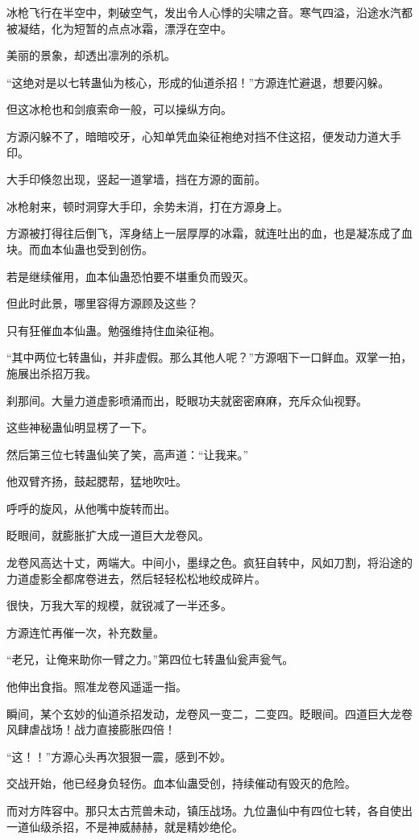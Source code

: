 \begin{this_body}
冰枪飞行在半空中，刺破空气，发出令人心悸的尖啸之音。寒气四溢，沿途水汽都被凝结，化为短暂的点点冰霜，漂浮在空中。

美丽的景象，却透出凛冽的杀机。

“这绝对是以七转蛊仙为核心，形成的仙道杀招！”方源连忙避退，想要闪躲。

但这冰枪也和剑痕索命一般，可以操纵方向。

方源闪躲不了，暗暗咬牙，心知单凭血染征袍绝对挡不住这招，便发动力道大手印。

大手印倏忽出现，竖起一道掌墙，挡在方源的面前。

冰枪射来，顿时洞穿大手印，余势未消，打在方源身上。

方源被打得往后倒飞，浑身结上一层厚厚的冰霜，就连吐出的血，也是凝冻成了血块。而血本仙蛊也受到创伤。

若是继续催用，血本仙蛊恐怕要不堪重负而毁灭。

但此时此景，哪里容得方源顾及这些？

只有狂催血本仙蛊。勉强维持住血染征袍。

“其中两位七转蛊仙，并非虚假。那么其他人呢？”方源咽下一口鲜血。双掌一拍，施展出杀招万我。

刹那间。大量力道虚影喷涌而出，眨眼功夫就密密麻麻，充斥众仙视野。

这些神秘蛊仙明显楞了一下。

然后第三位七转蛊仙笑了笑，高声道：“让我来。”

他双臂齐扬，鼓起腮帮，猛地吹吐。

呼呼的旋风，从他嘴中旋转而出。

眨眼间，就膨胀扩大成一道巨大龙卷风。

龙卷风高达十丈，两端大。中间小，墨绿之色。疯狂自转中，风如刀割，将沿途的力道虚影全都席卷进去，然后轻轻松松地绞成碎片。

很快，万我大军的规模，就锐减了一半还多。

方源连忙再催一次，补充数量。

“老兄，让俺来助你一臂之力。”第四位七转蛊仙瓮声瓮气。

他伸出食指。照准龙卷风遥遥一指。

瞬间，某个玄妙的仙道杀招发动，龙卷风一变二，二变四。眨眼间。四道巨大龙卷风肆虐战场！战力直接膨胀四倍！

“这！！”方源心头再次狠狠一震，感到不妙。

交战开始，他已经身负轻伤。血本仙蛊受创，持续催动有毁灭的危险。

而对方阵容中。那只太古荒兽未动，镇压战场。九位蛊仙中有四位七转，各自使出一道仙级杀招，不是神威赫赫，就是精妙绝伦。


\end{this_body}

